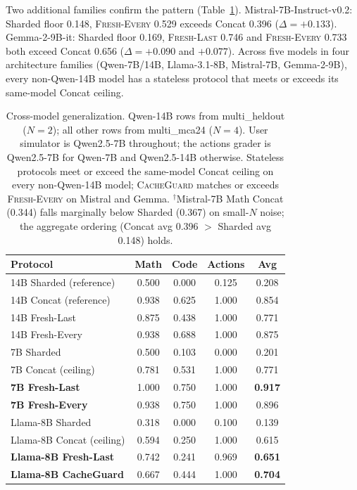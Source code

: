 \documentclass{article}
\begin{document}
Two additional families confirm the pattern (Table~\ref{tab:crossmodel}). Mistral-7B-Instruct-v0.2: Sharded floor 0.148, \textsc{Fresh-Every} 0.529 exceeds Concat 0.396 ($\Delta{=}{+}0.133$). Gemma-2-9B-it: Sharded floor 0.169, \textsc{Fresh-Last} 0.746 and \textsc{Fresh-Every} 0.733 both exceed Concat 0.656 ($\Delta{=}{+}0.090$ and ${+}0.077$). Across five models in four architecture families (Qwen-7B/14B, Llama-3.1-8B, Mistral-7B, Gemma-2-9B), every non-Qwen-14B model has a stateless protocol that meets or exceeds its same-model Concat ceiling.

\begin{table}[t]
\centering
\caption{Cross-model generalization. Qwen-14B rows from multi\_heldout ($N{=}2$); all other rows from multi\_mca24 ($N{=}4$). User simulator is Qwen2.5-7B throughout; the actions grader is Qwen2.5-7B for Qwen-7B and Qwen2.5-14B otherwise. Stateless protocols meet or exceed the same-model Concat ceiling on every non-Qwen-14B model; \textsc{CacheGuard} matches or exceeds \textsc{Fresh-Every} on Mistral and Gemma. $^\dagger$Mistral-7B Math Concat (0.344) falls marginally below Sharded (0.367) on small-$N$ noise; the aggregate ordering (Concat avg 0.396 $>$ Sharded avg 0.148) holds.}
\label{tab:crossmodel}
\begin{tabular}{lcccc}
\toprule
Protocol & Math & Code & Actions & Avg \\
\midrule
14B Sharded (reference) & 0.500 & 0.000 & 0.125 & 0.208 \\
14B Concat (reference) & 0.938 & 0.625 & 1.000 & 0.854 \\
14B Fresh-Last & 0.875 & 0.438 & 1.000 & 0.771 \\
14B Fresh-Every & 0.938 & 0.688 & 1.000 & 0.875 \\
\midrule
7B Sharded & 0.500 & 0.103 & 0.000 & 0.201 \\
7B Concat (ceiling) & 0.781 & 0.531 & 1.000 & 0.771 \\
\textbf{7B Fresh-Last} & 1.000 & 0.750 & 1.000 & \textbf{0.917} \\
\textbf{7B Fresh-Every} & 0.938 & 0.750 & 1.000 & 0.896 \\
\midrule
Llama-8B Sharded & 0.318 & 0.000 & 0.100 & 0.139 \\
Llama-8B Concat (ceiling) & 0.594 & 0.250 & 1.000 & 0.615 \\
\textbf{Llama-8B Fresh-Last} & 0.742 & 0.241 & 0.969 & \textbf{0.651} \\
\textbf{Llama-8B CacheGuard} & 0.667 & 0.444 & 1.000 & \textbf{0.704} \\

\end{tabular}
\end{table}
\end{document}
